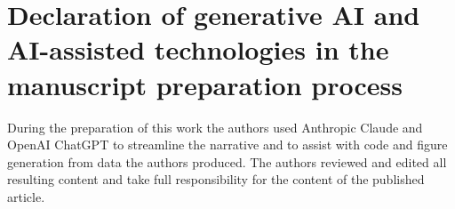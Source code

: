 \documentclass[11pt,a4paper]{article}
\newif\ifjne
\begin{document}
\ifjne
\section*{Competing interests}
GR is Chief Scientific and Technology Officer of Neuroelectrics, which develops and
commercializes transcranial stimulation devices. BM, AJ and FC are affiliated with
Neuroelectrics.

\section*{Author contributions}
Using the CRediT taxonomy: \textbf{G.~Ruffini}: conceptualization, methodology, formal
analysis, software, investigation, visualization, writing (original draft), supervision,
funding acquisition. \textbf{B.~Mercadal}: validation, visualization, writing (review
and editing). \textbf{A.~Just}: software, visualization, writing (review and editing).
\textbf{R.~de Palma Aristides}: software, visualization, writing (review and editing).
\textbf{F.~Castaldo}: conceptualization, writing (review and editing).
\textbf{N.~Grossman}: conceptualization.
\textbf{S.~Canals}: supervision, writing (review and editing).
\textbf{C.~Mirasso}: supervision, writing (review and editing).
\fi

\section*{Declaration of generative AI and AI-assisted technologies in the manuscript
preparation process}
During the preparation of this work the authors used Anthropic Claude and OpenAI ChatGPT to
streamline the narrative and to assist with code and figure generation from data the authors
produced. The authors reviewed and edited all resulting content and take full responsibility
for the content of the published article.
\end{document}
